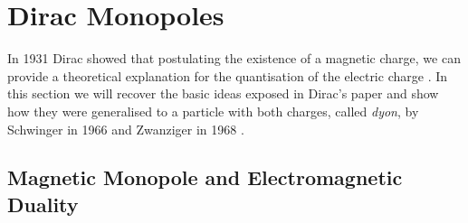 \documentclass[main.tex]{subfiles}
\begin{document}
\section{Dirac Monopoles}
In 1931 Dirac showed that postulating the existence of a magnetic charge, we can provide a theoretical explanation for the quantisation of the electric charge \cite{Dirac}. 
In this section we will recover the basic ideas exposed in Dirac's paper and show how they were generalised to a particle with both charges, called \textit{dyon}, by Schwinger in 1966 \cite{S:dyon} and Zwanziger in 1968 \cite{Z:dyon}.


\subsection{Magnetic Monopole and Electromagnetic Duality}
\end{document}
